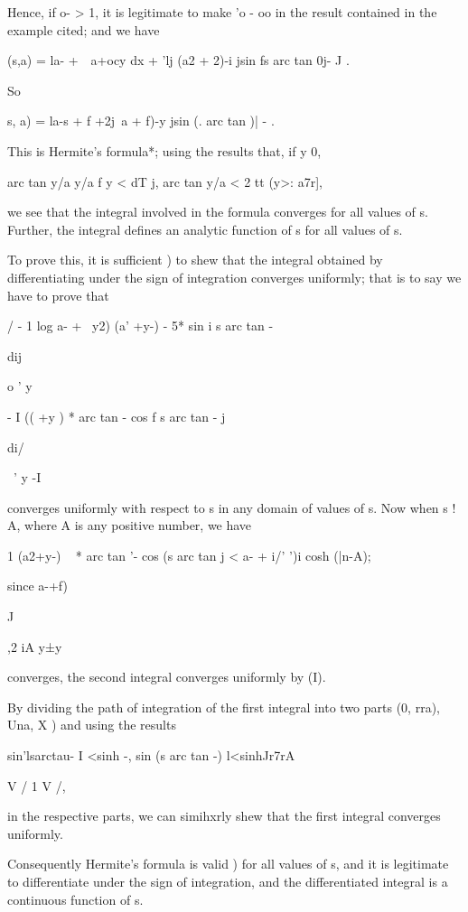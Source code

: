 Hence, if o- > 1, it is legitimate to make 'o - oo in the result
contained in the example cited; and we have

 (s,a) = la- +\ \ a+ocy dx + 'lj (a2 + 2)-i jsin fs arc tan 0j- J .

So

  s, a) = la-s + f +2j\ a + f)-y jsin (. arc tan )| - .

This is Hermite's formula*; using the results that, if y 0,

arc tan y/a y/a f y < dT j, arc tan y/a < 2 tt (y>: a7r],

we see that the integral involved in the formula converges for all
values of s. Further, the integral defines an analytic function of s
for all values of s.

To prove this, it is sufficient ) to shew that the integral
obtained by differentiating under the sign of integration converges
uniformly; that is to say we have to prove that

/ - 1 log a- + \ y2) (a' +y-) - 5* sin i s arc tan -

dij

o ' y

- I (( +y ) * arc tan - cos f s arc tan - j

di/

~' y -I

converges uniformly with respect to s in any domain of values of s.
Now when s ! A, where A is any positive number, we have

1 (a2+y-) ~ * arc tan '- cos (s arc tan j < a- + i/' ')i cosh (|n-A);

since a-+f)

  J

,2 iA y±y\

converges, the second integral converges uniformly by (I).

By dividing the path of integration of the first integral into two
parts (0, rra), Una, X ) and using the results

sin'lsarctau- I <sinh -, sin (s arc tan -) l<sinhJr7rA

V / 1 V /,

in the respective parts, we can simihxrly shew that the first integral
converges uniformly.

Consequently Hermite's formula is valid ) for all values of s,
and it is legitimate to differentiate under the sign of integration,
and the differentiated integral is a continuous function of s.

